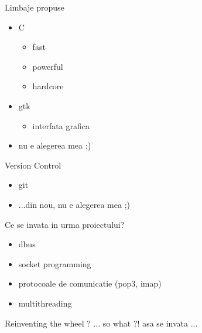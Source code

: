 \documentclass{beamer}
\begin{document}
\begin{frame}{Limbaje propuse}
\begin{itemize}
\item C\\\begin{itemize}\item fast \item powerful \item hardcore\end{itemize}
\item gtk\\\begin{itemize}\item interfata grafica\end{itemize}
\pause \vspace{1cm}
\item nu e alegerea mea ;)
\end{itemize}
\end{frame}

\begin{frame}{Version Control}
\begin{itemize}
\item git \vspace{1cm}
\item ...din nou, nu e alegerea mea ;)
\end{itemize}
\end{frame}

\begin{frame}{Ce se invata in urma proiectului?}
\begin{itemize}
\item dbus
\item socket programming
\item protocoale de comunicatie (pop3, imap)
\item multithreading
\end{itemize}
\end{frame}

\begin{frame}{Reinventing the wheel ?}
\pause
... so what ?! asa se invata ...
\end{frame}
\end{document}
